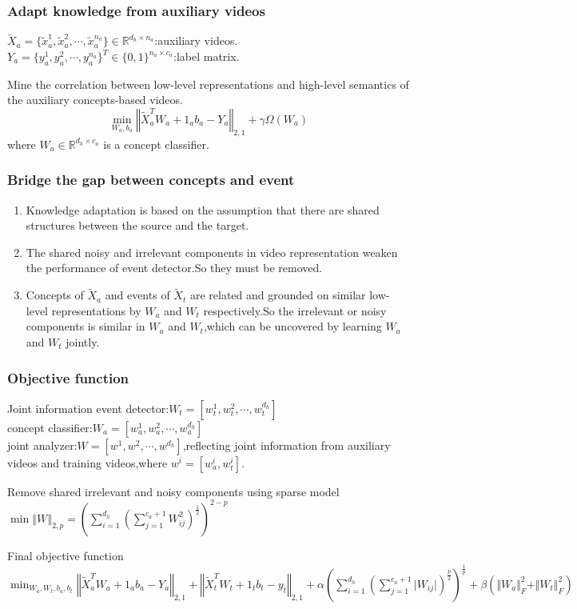 \documentclass{beamer}
\begin{document}
\begin{frame}\frametitle{Adapt knowledge from auxiliary videos}
$\tilde{X}_a=\{\tilde{x}_a^1,\tilde{x}_a^2,\cdots,\tilde{x}_a^{n_a}\}\in\mathbb{R}^{d_h\times n_a}$:auxiliary videos.\\
$Y_a=\{y_a^1,y_a^2,\cdots,y_a^{n_a}\}^T\in\{0,1\}^{n_a\times c_a}$:label matrix.
\begin{block}{}
Mine the correlation between low-level representations and high-level semantics of the auxiliary concepts-based videos.
\begin{equation}\label{eq:obj2}
\min_{W_a,b_a}\left\Vert \tilde{X}_a^TW_a+1_ab_a-Y_a\right\Vert_{2,1}+\gamma\Omega(W_a)
\end{equation}
where $W_a\in\mathbb{R}^{d_h\times c_a}$ is a concept classifier.
\end{block}
\end{frame}

\begin{frame}\frametitle{Bridge the gap between concepts and event}
\begin{enumerate}
\item Knowledge adaptation is based on the assumption that there are shared structures between the source and the target.
\item The shared noisy and irrelevant components in video representation weaken the performance of event detector.So they must be removed.
\item Concepts of $\tilde{X}_a$ and events of $\tilde{X}_t$ are related and grounded on similar low-level representations by $W_a$ and $W_t$ respectively.So the irrelevant or noisy components is similar in $W_a$ and $W_t$,which can be uncovered by learning $W_a$ and $W_t$ jointly.
\end{enumerate}
\end{frame}

\begin{frame}\frametitle{Objective function}
\begin{block}{Joint information}
event detector:$W_t=\left[ w_t^1,w_t^2,\cdots,w_t^{d_h}\right]$\\
concept classifier:$W_a=\left[ w_a^1,w_a^2,\cdots,w_a^{d_h}\right]$\\
joint analyzer:$W=\left[ w^1,w^2,\cdots,w^{d_h}\right]$,reflecting joint information from auxiliary videos and training videos,where $w^i=[w_a^i,w_t^i]$.
\end{block}
\begin{block}{Remove shared irrelevant and noisy components using sparse model}
$\min\left\Vert W\right\Vert_{2,p}=\left(\sum_{i=1}^{d_h}\left(\sum_{j=1}^{c_a+1} W_{ij}^2 \right)^{\frac{1}{2}}\right)^{2-p}$
\end{block}
\begin{block}{Final objective function}
$\min_{W_a,W_t,b_a,b_t}\left\Vert \tilde{X}_a^TW_a+1_ab_a-Y_a\right\Vert_{2,1}+\left\Vert \tilde{X}_t^TW_t+1_tb_t-y_t\right\Vert_{2,1}+\alpha\left(\sum_{i=1}^{d_h}\left(\sum_{j=1}^{c_a+1}\vert W_{ij}\vert\right)^{\frac{p}{2}}\right)^{\frac{1}{p}}+\beta\left(\Vert W_a\Vert_F^2+\Vert W_t\Vert_F^2\right)$
\end{block}
\end{frame}
\end{document}
